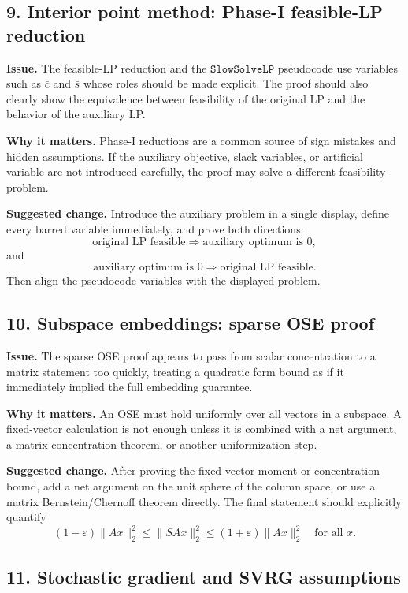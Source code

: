 \documentclass[11pt]{article}
\begin{document}
\subsection*{9. Interior point method: Phase-I feasible-LP reduction}

\textbf{Issue.}  The feasible-LP reduction and the \(\mathtt{SlowSolveLP}\) pseudocode use variables such as \(\bar c\) and \(\bar s\) whose roles should be made explicit.  The proof should also clearly show the equivalence between feasibility of the original LP and the behavior of the auxiliary LP.

\textbf{Why it matters.}  Phase-I reductions are a common source of sign mistakes and hidden assumptions.  If the auxiliary objective, slack variables, or artificial variable are not introduced carefully, the proof may solve a different feasibility problem.

\textbf{Suggested change.}  Introduce the auxiliary problem in a single display, define every barred variable immediately, and prove both directions:
\[
\text{original LP feasible}\Rightarrow \text{auxiliary optimum is }0,
\]
and
\[
\text{auxiliary optimum is }0\Rightarrow \text{original LP feasible}.
\]
Then align the pseudocode variables with the displayed problem.

\subsection*{10. Subspace embeddings: sparse OSE proof}

\textbf{Issue.}  The sparse OSE proof appears to pass from scalar concentration to a matrix statement too quickly, treating a quadratic form bound as if it immediately implied the full embedding guarantee.

\textbf{Why it matters.}  An OSE must hold uniformly over all vectors in a subspace.  A fixed-vector calculation is not enough unless it is combined with a net argument, a matrix concentration theorem, or another uniformization step.

\textbf{Suggested change.}  After proving the fixed-vector moment or concentration bound, add a net argument on the unit sphere of the column space, or use a matrix Bernstein/Chernoff theorem directly.  The final statement should explicitly quantify
\[
(1-\varepsilon)\|Ax\|_2^2\le \|SAx\|_2^2\le (1+\varepsilon)\|Ax\|_2^2
\quad\text{for all }x.
\]

\subsection*{11. Stochastic gradient and SVRG assumptions}
\end{document}
